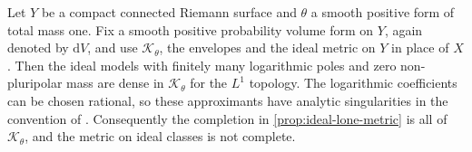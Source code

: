 \begin{theorem}\label{thm:curve-ideal-lone-completion}
Let $Y$ be a compact connected Riemann surface and $\theta$ a smooth positive form of total mass one. Fix a smooth positive probability volume form on $Y$, again denoted by $\mathrm{d}V$, and use $\mathcal K_\theta$, the envelopes and the ideal metric on $Y$ in place of $X$. Then the ideal models with finitely many logarithmic poles and zero non-pluripolar mass are dense in $\mathcal K_\theta$ for the $L^1$ topology. The logarithmic coefficients can be chosen rational, so these approximants have analytic singularities in the convention of \cite{SGPT}. Consequently the completion in \cref{prop:ideal-lone-metric} is all of $\mathcal K_\theta$, and the metric on ideal classes is not complete.
\end{theorem}
